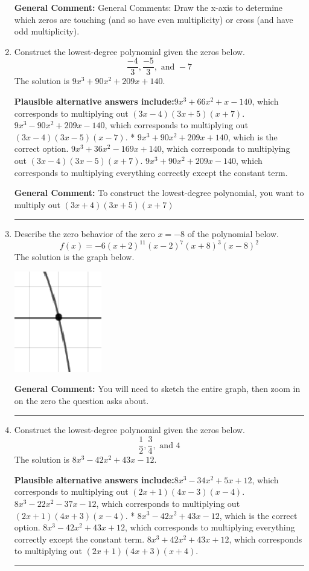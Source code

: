 \documentclass{extbook}[14pt]
\newcommand{\litem}[1]{\item #1

\rule{\textwidth}{0.4pt}}
\begin{document}
\begin{enumerate}
{\textbf{General Comment:} General Comments: Draw the x-axis to determine which zeros are touching (and so have even multiplicity) or cross (and have odd multiplicity).
}
\litem{
Construct the lowest-degree polynomial given the zeros below.
\[ \frac{-4}{3}, \frac{-5}{3}, \text{ and } -7 \]The solution is \( 9x^{3} +90 x^{2} +209 x + 140 \).\begin{enumerate}[label=\Alph*.]
\textbf{Plausible alternative answers include:}$9x^{3} +66 x^{2} +x -140$, which corresponds to multiplying out $(3x -4)(3x + 5)(x + 7)$.
$9x^{3} -90 x^{2} +209 x -140$, which corresponds to multiplying out $(3x -4)(3x -5)(x -7)$.
* $9x^{3} +90 x^{2} +209 x + 140$, which is the correct option.
$9x^{3} +36 x^{2} -169 x + 140$, which corresponds to multiplying out $(3x -4)(3x -5)(x + 7)$.
$9x^{3} +90 x^{2} +209 x -140$, which corresponds to multiplying everything correctly except the constant term.
\end{enumerate}

\textbf{General Comment:} To construct the lowest-degree polynomial, you want to multiply out $(3x + 4)(3x + 5)(x + 7)$
}
\litem{
Describe the zero behavior of the zero $x = -8$ of the polynomial below.
\[ f(x) = -6(x + 2)^{11}(x - 2)^{7}(x + 8)^{3}(x - 8)^{2} \]The solution is the graph below.
    \begin{center}
        \includegraphics[width=0.3\textwidth]{../Figures/polyZeroBehaviorCopyAB.png}
    \end{center}

\textbf{General Comment:} You will need to sketch the entire graph, then zoom in on the zero the question asks about.
}
\litem{
Construct the lowest-degree polynomial given the zeros below.
\[ \frac{1}{2}, \frac{3}{4}, \text{ and } 4 \]The solution is \( 8x^{3} -42 x^{2} +43 x -12 \).\begin{enumerate}[label=\Alph*.]
\textbf{Plausible alternative answers include:}$8x^{3} -34 x^{2} +5 x + 12$, which corresponds to multiplying out $(2x + 1)(4x -3)(x -4)$.
$8x^{3} -22 x^{2} -37 x -12$, which corresponds to multiplying out $(2x + 1)(4x + 3)(x -4)$.
* $8x^{3} -42 x^{2} +43 x -12$, which is the correct option.
$8x^{3} -42 x^{2} +43 x + 12$, which corresponds to multiplying everything correctly except the constant term.
$8x^{3} +42 x^{2} +43 x + 12$, which corresponds to multiplying out $(2x + 1)(4x + 3)(x + 4)$.
\end{enumerate}

}
\end{enumerate}
\end{document}
